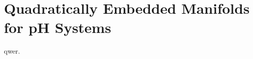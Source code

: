 \section{Quadratically Embedded Manifolds for pH Systems}\label{sec:quadratically-embedded-manifolds-ph-systems}

qwer.
